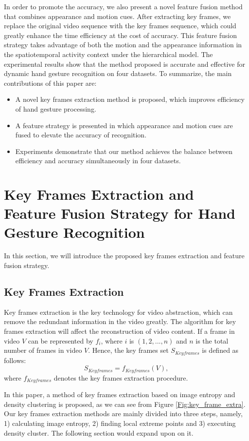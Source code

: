 \documentclass[5p]{elsarticle}
\begin{document}
In order to promote the accuracy, we also present a novel feature fusion method that combines appearance and motion cues.
After extracting key frames, we replace the original video sequence with the key frames sequence, which could greatly enhance the time efficiency at the cost of accuracy.
This feature fusion strategy takes advantage of both the motion and the appearance information in the spatiotemporal activity context under the hierarchical model.
The experimental results show that
the method proposed is accurate and effective for dynamic hand gesture recognition on four datasets.
To summarize, the main contributions of this paper are:
\begin{itemize}
	\item A novel key frames extraction method is proposed, which improves efficiency of hand gesture processing.
	\item A feature strategy is presented in which appearance and motion cues are fused to elevate the accuracy of recognition.
	\item Experiments demonstrate that our method achieves the balance between efficiency and accuracy simultaneously in four datasets.
\end{itemize}

\section{Key Frames Extraction and Feature Fusion Strategy for Hand Gesture Recognition}
\label{sec:propo}
In this section, we will introduce the proposed key frames extraction and feature fusion strategy.
\subsection{Key Frames Extraction}
Key frames extraction is the key technology for video abstraction, which can remove the redundant information in the video greatly.
The algorithm for key frames extraction will affect the reconstruction of video content.
If a frame in video $V$ can be represented by $f_i$, where $i$ is $(1, 2, . . . , n)$ and $n$ is the total number of frames in video $V$.
Hence, the key frames set $S_\mathit{Keyframes}$ is defined as follows:
\begin{equation}
\label{equ:keyfra}
S_\mathit{Keyframes} = f_\mathit{Keyframes}(V),
\end{equation}
where $f_\mathit{Keyframes}$ denotes the key frames extraction procedure.

In this paper, a method of key frames extraction based on image entropy and density clustering is proposed, as we can see from Figure \ref{Fig:key_frame_extra}.
Our key frames extraction methods are mainly divided into three steps, namely, 1) calculating image entropy, 2) finding local extreme points and 3) executing density cluster.
The following section would expand upon on it.
\end{document}
